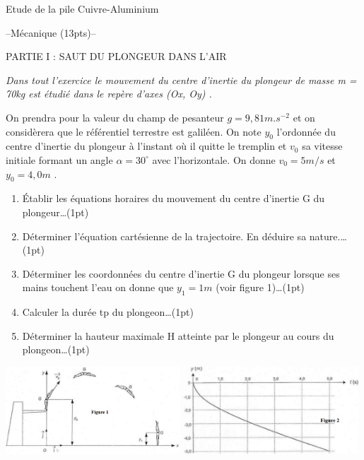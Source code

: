 \documentclass[12pt]{article}
\begin{document}
\begin{Box2}{Etude de la pile Cuivre-Aluminium}
\begin{enumerate}
\begin{enumerate}
    \end{enumerate}
\end{enumerate}
\end{Box2}


\begin{center}
	\hrulefill
  \Large{--Mécanique (13pts)--}
	\hrulefill\\

\end{center}
\vspace{0.7cm}

\begin{Box2}{PARTIE I : SAUT DU PLONGEUR DANS L’AIR }




	\emph{Dans tout l’exercice le mouvement du centre d’inertie du plongeur de masse m = 70kg est étudié dans le
repère d’axes (Ox, Oy) . }

  On prendra pour la valeur du champ de pesanteur $g = 9, 81m.s^{-2}$
et on considèrera que le référentiel terrestre
est galiléen. On note $y_0$ l’ordonnée du centre d’inertie du plongeur à l’instant où il quitte le tremplin et $v_0$ sa
  vitesse initiale formant un angle $\alpha = 30^{\circ}$ avec l’horizontale.
On donne $v_0 = 5m/s$
et $y_0 = 4,0m$ .

	\begin{enumerate}
    \item Établir les équations horaires du mouvement du centre d’inertie G du plongeur\dots(1pt)
    \item Déterminer l’équation cartésienne de la trajectoire. En déduire sa nature.\dots(1pt)
    \item Déterminer les coordonnées du centre d’inertie G du plongeur lorsque ses mains touchent l’eau on donne
      que $y_1 = 1m$ (voir figure 1)\dots(1pt)
    \item Calculer la durée tp du plongeon\dots(1pt)
    \item Déterminer la hauteur maximale H atteinte par le plongeur au cours du plongeon\dots(1pt)
	\end{enumerate}
	\begin{center}
		\includegraphics[width=0.49\textwidth]{./img/plangeur00.png}
		\includegraphics[width=0.49\textwidth]{./img/plangeur01.png}
	\end{center}


\end{Box2}
\end{document}
